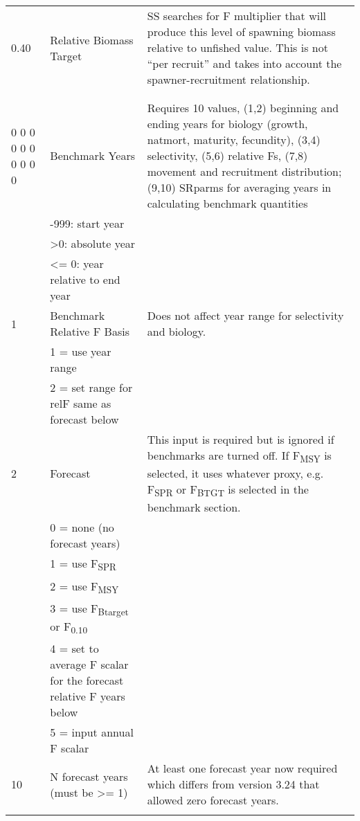 \begin{landscape}
{\begin{longtable}{p{3.2cm} p{7cm} p{10.8cm}}
 \hline
 0.40 & Relative Biomass Target & \multirow{1}{1cm}[-0.25cm]{\parbox{11cm }{ SS searches for F multiplier that will produce this level of spawning biomass relative to unfished value.  This is not “per recruit” and takes into account the spawner-recruitment relationship.}} \Tstrut\\
      & & \Bstrut\\
      & & \Bstrut\\
  
 \hline
 0 0 0 0 0 0 0 0 0 0 & Benchmark Years & \multirow{1}{1cm}[-0.25cm]{\parbox{11cm }{ Requires 10 values, (1,2) beginning and ending years for biology (growth, natmort, maturity, fecundity), (3,4) selectivity, (5,6) relative Fs, (7,8) movement and recruitment distribution; (9,10) SRparms for averaging years in calculating benchmark quantities}} \Tstrut\\
  & -999: start year & \\
  & >0:   absolute year & \\
  & <= 0: year relative to end year & \\


  \pagebreak
  1 & Benchmark Relative F Basis &  \multirow{1}{1cm}[-0.25cm]{\parbox{11cm }{ Does not affect year range for selectivity and biology.}} \Tstrut\\
    & 1 = use year range & \\
    & 2 = set range for relF same as forecast below & \\
    
  \hline
  2 & Forecast & \multirow{1}{1cm}[-0.25cm]{\parbox{11cm }{ This input is required but is ignored if benchmarks are turned off.  If F\textsubscript{MSY} is selected, it uses whatever proxy, e.g. F\textsubscript{SPR} or F\textsubscript{BTGT} is selected in the benchmark section.}} \Tstrut\\
    & 0 = none (no forecast years) & \\
    & 1 = use F\textsubscript{SPR} & \\
    & 2 = use F\textsubscript{MSY} & \\
    & 3 = use F\textsubscript{Btarget} or F\textsubscript{0.10} & \\
    & 4 = set to average F scalar for the forecast relative F years below & \\
    & 5 = input annual F scalar & \Bstrut\\
    
  \hline
  10 & N forecast years (must be >= 1) &  \multirow{1}{1cm}[-0.25cm]{\parbox{11cm }{ At least one forecast year now required which differs from version 3.24 that allowed zero forecast years.}} \Tstrut\\
     & & \Bstrut\\
     

\end{longtable}}
\end{landscape}
